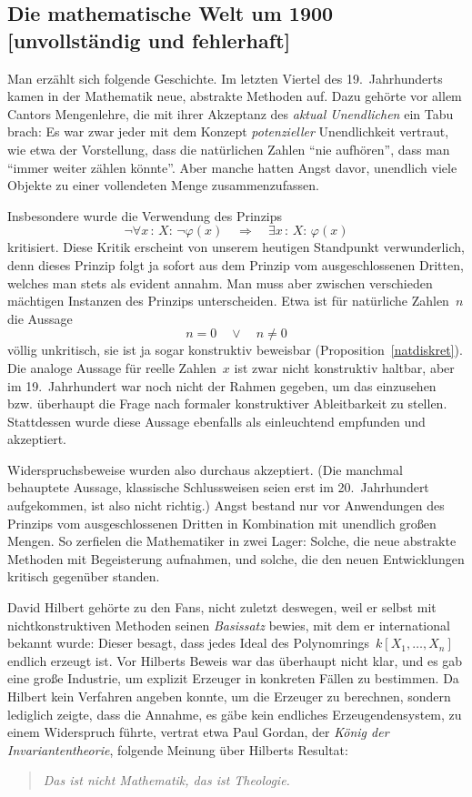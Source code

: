 \documentclass[a4paper,ngerman,12pt]{scrartcl}
\theoremstyle{definition}
\theoremstyle{plain}
\theoremstyle{remark}
\renewcommand{\_}{\mathpunct{.}\,}
\newcommand{\?}{\,{:}\,}
\begin{document}
\subsection[Die mathematische Welt um 1900]{Die mathematische Welt um 1900
\qquad\small[unvollständig und fehlerhaft]}

Man erzählt sich folgende Geschichte. Im letzten Viertel des 19.~Jahrhunderts
kamen in der Mathematik neue, abstrakte Methoden auf. Dazu gehörte vor allem
Cantors Mengenlehre, die mit ihrer Akzeptanz des \emph{aktual Unendlichen} ein
Tabu brach: Es war zwar jeder mit dem Konzept \emph{potenzieller} Unendlichkeit
vertraut, wie etwa der Vorstellung, dass die natürlichen Zahlen "`nie
aufhören"', dass man "`immer weiter zählen könnte"'. Aber manche hatten Angst
davor, unendlich viele Objekte zu einer vollendeten Menge zusammenzufassen.

Insbesondere wurde die Verwendung des Prinzips
\[ \neg\forall x\?X{:}\, \neg\varphi(x) \quad\Longrightarrow\quad
  \exists x\?X{:}\, \varphi(x) \]
kritisiert. Diese Kritik erscheint von unserem heutigen Standpunkt verwunderlich, denn
dieses Prinzip folgt ja sofort aus dem Prinzip vom ausgeschlossenen Dritten,
welches man stets als evident annahm. Man muss aber zwischen verschieden
mächtigen Instanzen des Prinzips unterscheiden. Etwa ist für natürliche
Zahlen~$n$ die Aussage
\[ n = 0 \quad\vee\quad n \neq 0 \]
völlig unkritisch, sie ist ja sogar konstruktiv beweisbar (Proposition~\ref{natdiskret}). Die analoge Aussage für
reelle Zahlen~$x$ ist zwar nicht konstruktiv haltbar, aber im 19.~Jahrhundert
war noch nicht der Rahmen gegeben, um das einzusehen bzw. überhaupt die Frage
nach formaler konstruktiver Ableitbarkeit zu stellen. Stattdessen wurde diese
Aussage ebenfalls als einleuchtend empfunden und akzeptiert.

Widerspruchsbeweise wurden also durchaus akzeptiert. (Die manchmal behauptete
Aussage, klassische Schlussweisen seien erst im 20.~Jahrhundert aufgekommen, ist also
nicht richtig.) Angst bestand nur vor Anwendungen des Prinzips vom
ausgeschlossenen Dritten in Kombination mit unendlich großen Mengen. So
zerfielen die Mathematiker in zwei Lager: Solche, die neue abstrakte Methoden
mit Begeisterung aufnahmen, und solche, die den neuen Entwicklungen kritisch
gegenüber standen.

David Hilbert gehörte zu den Fans, nicht zuletzt deswegen, weil er selbst mit
nichtkonstruktiven Methoden seinen \emph{Basissatz} bewies, mit dem er
international bekannt wurde: Dieser besagt, dass jedes Ideal des
Polynomrings~$k[X_1,\ldots,X_n]$ endlich erzeugt ist. Vor Hilberts Beweis war
das überhaupt nicht klar, und es gab eine große Industrie, um explizit Erzeuger in
konkreten Fällen zu bestimmen. Da Hilbert kein Verfahren angeben konnte,
um die Erzeuger zu berechnen, sondern lediglich zeigte, dass die Annahme,
es gäbe kein endliches Erzeugendensystem, zu einem Widerspruch führte, vertrat
etwa Paul Gordan, der \emph{König der
Invariantentheorie}, folgende Meinung über Hilberts Resultat:
\begin{quote}
\emph{Das ist nicht Mathematik, das ist Theologie.}
\end{quote}
\end{document}
